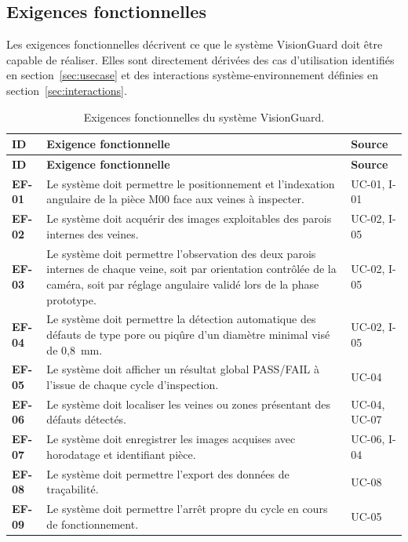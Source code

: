 \subsection{Exigences fonctionnelles}

Les exigences fonctionnelles décrivent ce que le système VisionGuard doit être capable de
réaliser. Elles sont directement dérivées des cas d'utilisation identifiés en
section~\ref{sec:usecase} et des interactions système-environnement définies en
section~\ref{sec:interactions}.
\renewcommand{\arraystretch}{1.3}
\begin{longtable}{|p{1.2cm}|p{12.3cm}|p{1.5cm}|}
\caption{Exigences fonctionnelles du système VisionGuard.}
\label{tab:ef} \\
\hline
\rowcolor{navyblue}
\textbf{\color{white}ID} & \textbf{\color{white}Exigence fonctionnelle} & \textbf{\color{white}Source} \\
\hline
\endfirsthead
\hline
\rowcolor{navyblue}
\textbf{\color{white}ID} & \textbf{\color{white}Exigence fonctionnelle} & \textbf{\color{white}Source} \\
\hline
\endhead
\hline
\endfoot
\textbf{EF-01} & Le système doit permettre le positionnement et l'indexation angulaire de la pièce M00 face aux veines à inspecter.
    & UC-01, I-01 \\ \hline
\textbf{EF-02} & Le système doit acquérir des images exploitables des parois internes des veines.
    & UC-02, I-05 \\ \hline
\textbf{EF-03} & Le système doit permettre l'observation des deux parois internes de chaque veine, soit par orientation contrôlée de la caméra, soit par réglage angulaire validé lors de la phase prototype.
    & UC-02, I-05 \\ \hline
\textbf{EF-04} & Le système doit permettre la détection automatique des défauts de type pore ou piqûre d'un diamètre minimal visé de 0,8~mm.
    & UC-02, I-05 \\ \hline
\textbf{EF-05} & Le système doit afficher un résultat global PASS/FAIL à l'issue de chaque cycle d'inspection.
    & UC-04 \\ \hline
\textbf{EF-06} & Le système doit localiser les veines ou zones présentant des défauts détectés.
    & UC-04, UC-07 \\ \hline
\textbf{EF-07} & Le système doit enregistrer les images acquises avec horodatage et identifiant pièce.
    & UC-06, I-04 \\ \hline
\textbf{EF-08} & Le système doit permettre l'export des données de traçabilité.
    & UC-08 \\ \hline
\textbf{EF-09} & Le système doit permettre l'arrêt propre du cycle en cours de fonctionnement.
    & UC-05 \\ \hline
\end{longtable}

